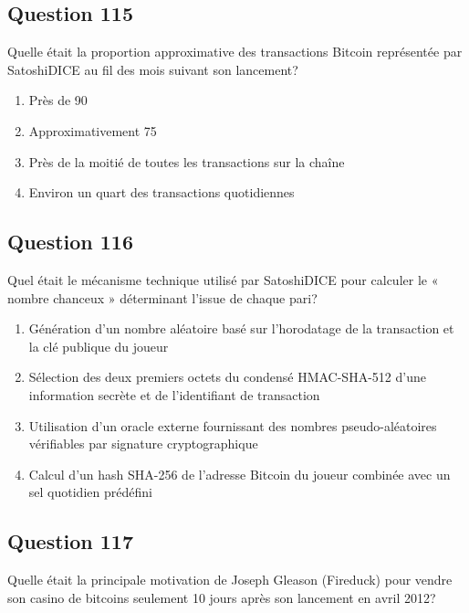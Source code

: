 \documentclass[12pt,a4paper]{article}
\begin{document}
\bigskip


\subsection*{Question 115}
Quelle était la proportion approximative des transactions Bitcoin représentée par SatoshiDICE au fil des mois suivant son lancement?

\begin{enumerate}[label=\Alph*., leftmargin=*]
\item Près de 90%
\item Approximativement 75%
\item Près de la moitié de toutes les transactions sur la chaîne
\item Environ un quart des transactions quotidiennes
\end{enumerate}

\bigskip


\subsection*{Question 116}
Quel était le mécanisme technique utilisé par SatoshiDICE pour calculer le « nombre chanceux » déterminant l'issue de chaque pari?

\begin{enumerate}[label=\Alph*., leftmargin=*]
\item Génération d'un nombre aléatoire basé sur l'horodatage de la transaction et la clé publique du joueur
\item Sélection des deux premiers octets du condensé HMAC-SHA-512 d'une information secrète et de l'identifiant de transaction
\item Utilisation d'un oracle externe fournissant des nombres pseudo-aléatoires vérifiables par signature cryptographique
\item Calcul d'un hash SHA-256 de l'adresse Bitcoin du joueur combinée avec un sel quotidien prédéfini
\end{enumerate}

\bigskip


\subsection*{Question 117}
Quelle était la principale motivation de Joseph Gleason (Fireduck) pour vendre son casino de bitcoins seulement 10 jours après son lancement en avril 2012?
\end{document}
